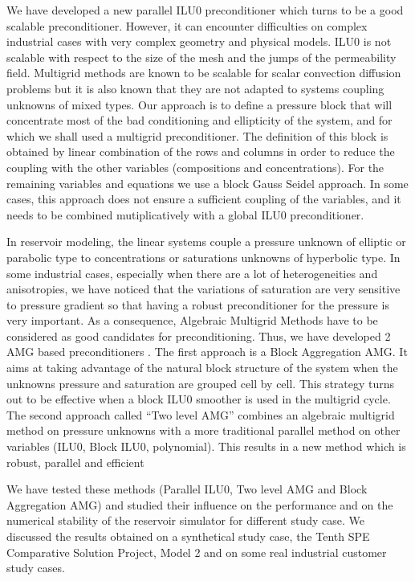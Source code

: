 \documentclass[twosided]{report}
\begin{document}
We have developed a new parallel ILU0 preconditioner which turns to be
a good scalable preconditioner. However, it can encounter difficulties
on complex industrial cases with very complex geometry and physical
models. ILU0 is not scalable with respect to the size of the mesh and
the jumps of the permeability field. Multigrid methods are known to be
scalable for scalar convection diffusion problems but it is also known
that they are not adapted to systems coupling unknowns of mixed types.
Our approach is to define a pressure block that will concentrate most
of the bad conditioning and ellipticity of the system, and for which we
shall used a multigrid preconditioner. The definition of this block is
obtained by linear combination of the rows and columns in order to
reduce the coupling with the other variables (compositions and
concentrations). For the remaining variables and equations we use a
block Gauss Seidel approach. In some cases, this approach does not
ensure a sufficient coupling of the variables, and it needs to be
combined mutiplicatively with a global ILU0 preconditioner.

In reservoir modeling, the linear systems couple a pressure unknown of
elliptic or parabolic type to concentrations or saturations unknowns of
hyperbolic type. In some industrial cases, especially when there are a
lot of heterogeneities and anisotropies, we have noticed that the
variations of saturation are very sensitive to pressure gradient so
that having a robust preconditioner for the pressure is very
important. As a consequence, Algebraic Multigrid Methods have to be
considered as good candidates for preconditioning. Thus, we have
developed 2 AMG based preconditioners . The first approach is a Block
Aggregation AMG. It aims at taking advantage of the natural block
structure of the system when the unknowns pressure and saturation are
grouped cell by cell. This strategy turns out to be effective when a
block ILU0 smoother is used in the multigrid cycle. The second approach
called ``Two level AMG'' combines an algebraic multigrid method on
pressure unknowns with a more traditional parallel method on other
variables (ILU0, Block ILU0, polynomial). This results in a new method
which is robust, parallel and efficient

We have tested these methods (Parallel ILU0, Two level AMG and Block
Aggregation AMG) and studied their influence on the performance and on
the numerical stability of the reservoir simulator for different study
case. We discussed the results obtained on a synthetical study case,
the Tenth SPE Comparative Solution Project, Model 2 and on some real
industrial customer study cases.
\end{document}
